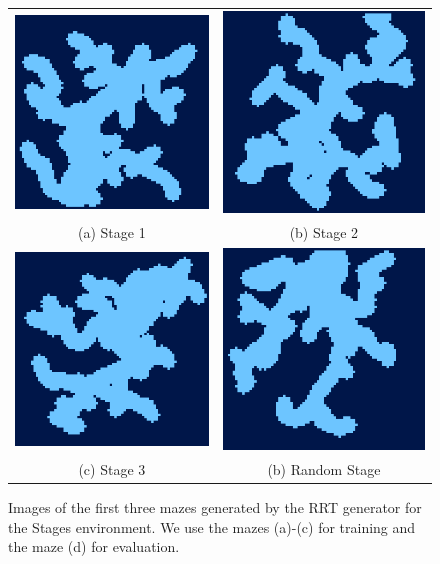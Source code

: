 \begin{figure}[htp]
    \begin{center}
        \begin{tabular}{cc}
            \includegraphics[clip, width=0.25\columnwidth]{figures/evaluation/randomness/instances/stage0_upscaled.png} &
            \includegraphics[clip, width=0.25\columnwidth]{figures/evaluation/randomness/instances/stage1_upscaled.png} \\
            {\small (a) Stage 1} & {\small (b) Stage 2} \\
            \addlinespace[0.25cm]
            \includegraphics[clip, width=0.25\columnwidth]{figures/evaluation/randomness/instances/stage2_upscaled.png} &
            \includegraphics[clip, width=0.25\columnwidth]{figures/evaluation/randomness/instances/stage3_upscaled.png} \\
            {\small (c) Stage 3} & {\small (b) Random Stage} \\
            
        \end{tabular}
    \end{center}
    \caption[Images of Random Mazes Used by the Stages Environment]{Images of the first three mazes generated by the RRT generator for the Stages environment. We use the mazes (a)-(c) for training and the maze (d) for evaluation.} \label{fig:Eval/RandomMaze/Stages}
\end{figure}


